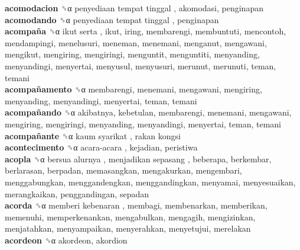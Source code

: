 \textbf{acomodacion} ␝α   penyediaan tempat tinggal , akomodasi, penginapan  \\
\textbf{acomodando} ␝α   penyediaan tempat tinggal , penginapan  \\
\textbf{acompaña} ␝α   ikut serta , ikut, iring, membarengi, membuntuti, mencontoh, mendampingi, menelusuri, meneman, menemani, menganut, mengawani, mengikut, mengiring, mengiringi, menguntit, menguntiti, menyanding, menyandingi, menyertai, menyusul, menyusuri, merunut, merunuti, teman, temani  \\
\textbf{acompañamento} ␝α  membarengi, menemani, mengawani, mengiring, menyanding, menyandingi, menyertai, teman, temani  \\
\textbf{acompañando} ␝α  akibatnya, kebetulan, membarengi, menemani, mengawani, mengiring, mengiringi, menyanding, menyandingi, menyertai, teman, temani  \\
\textbf{acompañante} ␝α   kaum syarikat ,  rakan kongsi   \\
\textbf{acontecimento} ␝α   acara-acara , kejadian, peristiwa  \\
\textbf{acopla} ␝α   bersua alurnya ,  menjadikan sepasang , beberapa, berkembar, berlarasan, berpadan, memasangkan, mengakurkan, mengembari, menggabungkan, menggandengkan, menggandingkan, menyamai, menyesuaikan, merangkaikan, penggandingan, sepadan  \\
\textbf{acorda} ␝α   memberi kebenaran , membagi, membenarkan, memberikan, memenuhi, memperkenankan, mengabulkan, mengagih, mengizinkan, menjatahkan, menyampaikan, menyerahkan, menyetujui, merelakan  \\
\textbf{acordeon} ␝α  akordeon, akordion  \\
